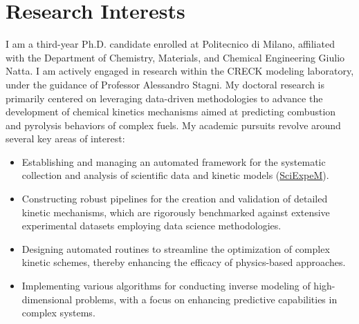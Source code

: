 \section{\sc Research Interests}
%
%
%
%

I am a third-year Ph.D. candidate enrolled at Politecnico di Milano, affiliated with the
Department of Chemistry, Materials, and Chemical Engineering Giulio Natta. I am actively
engaged in research within the CRECK modeling laboratory, under the guidance of Professor
Alessandro Stagni. My doctoral research is primarily centered on leveraging data-driven
methodologies to advance the development of chemical kinetics mechanisms aimed at
predicting combustion and pyrolysis behaviors of complex fuels. My academic pursuits
revolve around several key areas of interest:

\begin{itemize}
   \item Establishing and managing an automated framework for the systematic collection
      and analysis of scientific data and kinetic models
      (\href{https://sciexpem.polimi.it}{SciExpeM}).

   \item Constructing robust pipelines for the creation and validation of detailed kinetic
      mechanisms, which are rigorously benchmarked against extensive experimental datasets
      employing data science methodologies.

   \item Designing automated routines to streamline the optimization of complex kinetic
      schemes, thereby enhancing the efficacy of physics-based approaches.

   \item Implementing various algorithms for conducting inverse modeling of
      high-dimensional problems, with a focus on enhancing predictive capabilities in
      complex systems.
\end{itemize}

